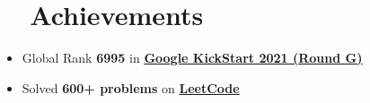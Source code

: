 \documentclass[a4paper,11pt]{article}
\newcommand{\resumeSubHeadingListStart}{\begin{itemize}[leftmargin=*]}
\newcommand{\resumeSubHeadingListEnd}{\end{itemize}}
\begin{document}
\section{~~Achievements}
\resumeSubHeadingListStart
  \item{Global Rank \textbf{6995} in \href{https://drive.google.com/file/d/1d8atpzNBupgONeB_iePOTynCu0L2hagw/view?usp=sharing}{\textbf{Google KickStart 2021 (Round G)}}}
  \vspace{-1pt}
  \item{Solved \textbf{600+ problems} on \href{https://leetcode.com/nimeshjohari02/}{\textbf{LeetCode}}}
\resumeSubHeadingListEnd
\end{document}
